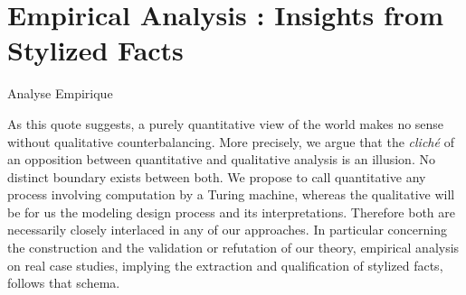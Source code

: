 


\chapter{Empirical Analysis : Insights from Stylized Facts}{Analyse Empirique} %

\label{ch:empirical} %





\bigskip












As this quote suggests, a purely quantitative view of the world makes no sense without qualitative counterbalancing. More precisely, we argue that the \textit{clich{\'e}} of an opposition between quantitative and qualitative analysis is an illusion. No distinct boundary exists between both. We propose to call quantitative any process involving computation by a Turing machine, whereas the qualitative will be for us the modeling design process and its interpretations. 
 Therefore both are necessarily closely interlaced in any of our approaches. In particular concerning the construction and the validation or refutation of our theory, empirical analysis on real case studies, implying the extraction and qualification of stylized facts, follows that schema.


